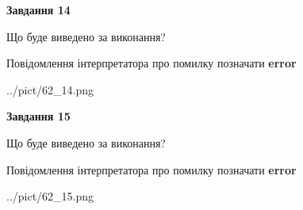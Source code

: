 \documentclass[11pt, ukrainian]{article}
\begin{document}
{\begin {large}
{\begin {center}\textbf{Завдання 14}\end {center}}\par
Що буде виведено за виконання? \par
Повідомлення інтерпретатора про помилку позначати \textbf{error}

\begin{center}
	{../pict/62_14.png}
\end{center}
\newpage

{\begin {center}\textbf{Завдання 15}\end {center}}\par
Що буде виведено за виконання? \par
Повідомлення інтерпретатора про помилку позначати \textbf{error}

\begin{center}
	{../pict/62_15.png}
\end{center}
\newpage

\end {large}}
\end{document}
